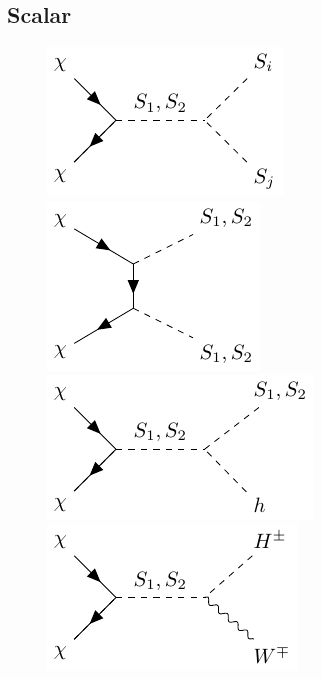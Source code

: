 \subsection{Scalar}

\begin{figure}
    \centering
    \hspace{2em} 
    \includegraphics{texinputs/05_relic/figures/relic_scalar/XXSS.pdf} \hspace{3em} \vspace{2em} 
    \includegraphics{texinputs/05_relic/figures/relic_scalar/XXSSt.pdf} \hspace{3em} 
    \includegraphics{texinputs/05_relic/figures/relic_scalar/XXSh.pdf}  \hspace{0.5em} \\ 
    \includegraphics{texinputs/05_relic/figures/relic_scalar/XXWH.pdf} \hspace{2em} 

\end{figure}
